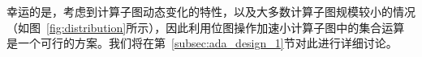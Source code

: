幸运的是，考虑到计算子图动态变化的特性，以及大多数计算子图规模较小的情况（如图~\ref{fig:distribution}所示），因此利用位图操作加速小计算子图中的集合运算是一个可行的方案。我们将在第~\ref{subsec:ada_design_1}节对此进行详细讨论。










